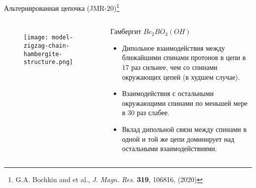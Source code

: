 \begin{frame}{Альтернированная цепочка (JMR-20)\footnote[frame]{
        G.A. Bochkin and et al., \textit{J. Magn. Res.} \textbf{319}, 106816, (2020)}}
\begin{columns}

    \begin{figure}
      \texttt{[image: model-zigzag-chain-hambergite-structure.png]}
      \caption{}
    \end{figure}

    \begin{block}{Гамбергит $Be_2BO_3(OH)$ }
        \begin{itemize}
            \item Дипольное взаимодействия между ближайшими спинами протонов в цепи в 17 раз сильнее, чем со спинами окружающих цепей (в худшем случае).
            \item Взаимодействия с остальными окружающими спинами по меньшей мере в 30 раз слабее.
            \item Вклад дипольной связи между спинами в одной и той же цепи доминирует над остальными взаимодействиями.
        \end{itemize}
    \end{block}

\end{columns}
\end{frame}
